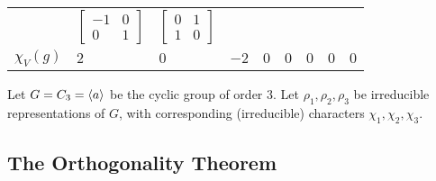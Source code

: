 \begin{example}
\begin{table}[H]
\begin{tabular}{|c|C{1.2cm} C{1.55cm} C{1.85cm} C{1.55cm} C{1.55cm} C{1.85cm} C{1.55cm} C{1.2cm}|}
            &
            $\begin{bmatrix} -1 & 0 \\ 0 & 1 \end{bmatrix}$
            &
            $\begin{bmatrix} 0 & 1 \\ 1 & 0 \end{bmatrix}$
            \\
            $\chi_V(g)$ & $2$ & $0$ & $-2$ & $0$ & $0$ & $0$ & $0$ & $0$ \\
            \hline
        \end{tabular}
    \end{table}
\end{example}

\begin{example}
    Let $G = C_3 = \left\langle a \right\rangle$ be the cyclic group of order $3$. Let $\rho_1, \rho_2, \rho_3$ be irreducible representations of $G$, with corresponding (irreducible) characters $\chi_1, \chi_2, \chi_3$.
\end{example}

\subsection{The Orthogonality Theorem}

